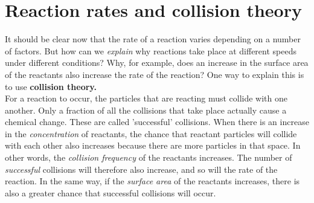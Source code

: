 






\section{Reaction rates and collision theory}

It should be clear now that the rate of a reaction varies depending on a number of factors. But how can we \textit{explain} why reactions take place at different speeds under different conditions? Why, for example, does an increase in the surface area of the reactants also increase the rate of the reaction? One way to explain this is to use \textbf{collision theory.}\\
 
For a reaction to occur, the particles that are reacting must collide with one another. Only a fraction of all the collisions that take place actually cause a chemical change. These are called 'successful' collisions. When there is an increase in the \textit{concentration} of reactants, the chance that reactant particles will collide with each other also increases because there are more particles in that space. In other words, the \textit{collision frequency} of the reactants increases. The number of \textit{successful} collisions will therefore also increase, and so will the rate of the reaction. In the same way, if the \textit{surface area} of the reactants increases, there is also a greater chance that successful collisions will occur.

